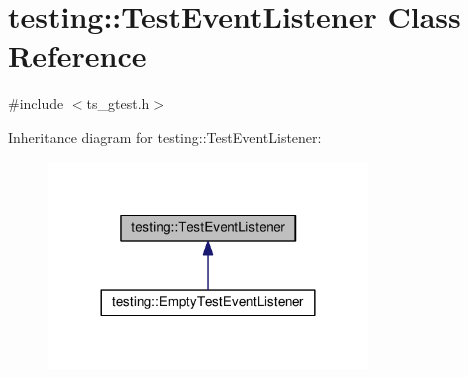 \hypertarget{classtesting_1_1TestEventListener}{\section{testing\-:\-:Test\-Event\-Listener Class Reference}
\label{classtesting_1_1TestEventListener}
}


{\ttfamily \#include $<$ts\-\_\-gtest.\-h$>$}



Inheritance diagram for testing\-:\-:Test\-Event\-Listener\-:\nopagebreak
\begin{figure}[H]
\begin{center}
\leavevmode
\includegraphics[width=240pt]{classtesting_1_1TestEventListener__inherit__graph}
\end{center}
\end{figure}
